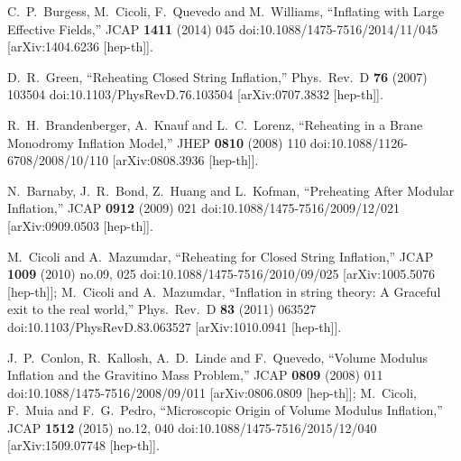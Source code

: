 \documentclass[11pt,a4paper]{article}
\begin{document}
\begin{thebibliography}{99}
  C.~P.~Burgess, M.~Cicoli, F.~Quevedo and M.~Williams,
  ``Inflating with Large Effective Fields,''
  JCAP {\bf 1411} (2014) 045
  doi:10.1088/1475-7516/2014/11/045
  [arXiv:1404.6236 [hep-th]].

  D.~R.~Green,
  ``Reheating Closed String Inflation,''
  Phys.\ Rev.\ D {\bf 76} (2007) 103504
  doi:10.1103/PhysRevD.76.103504
  [arXiv:0707.3832 [hep-th]].

  R.~H.~Brandenberger, A.~Knauf and L.~C.~Lorenz,
  ``Reheating in a Brane Monodromy Inflation Model,''
  JHEP {\bf 0810} (2008) 110
  doi:10.1088/1126-6708/2008/10/110
  [arXiv:0808.3936 [hep-th]].

  N.~Barnaby, J.~R.~Bond, Z.~Huang and L.~Kofman,
  ``Preheating After Modular Inflation,''
  JCAP {\bf 0912} (2009) 021
  doi:10.1088/1475-7516/2009/12/021
  [arXiv:0909.0503 [hep-th]].

  M.~Cicoli and A.~Mazumdar,
  ``Reheating for Closed String Inflation,''
  JCAP {\bf 1009} (2010) no.09,  025
  doi:10.1088/1475-7516/2010/09/025
  [arXiv:1005.5076 [hep-th]];
	M.~Cicoli and A.~Mazumdar,
  ``Inflation in string theory: A Graceful exit to the real world,''
  Phys.\ Rev.\ D {\bf 83} (2011) 063527
  doi:10.1103/PhysRevD.83.063527
  [arXiv:1010.0941 [hep-th]].

  J.~P.~Conlon, R.~Kallosh, A.~D.~Linde and F.~Quevedo,
  ``Volume Modulus Inflation and the Gravitino Mass Problem,''
  JCAP {\bf 0809} (2008) 011
  doi:10.1088/1475-7516/2008/09/011
  [arXiv:0806.0809 [hep-th]];
M.~Cicoli, F.~Muia and F.~G.~Pedro,
  ``Microscopic Origin of Volume Modulus Inflation,''
  JCAP {\bf 1512} (2015) no.12,  040
  doi:10.1088/1475-7516/2015/12/040
  [arXiv:1509.07748 [hep-th]].


\end{thebibliography}
\end{document}
